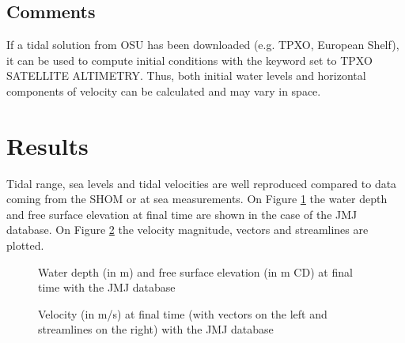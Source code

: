 \subsection{Comments}
%
If a tidal solution from OSU has been downloaded (e.g. TPXO, European
Shelf), it can be used to compute initial conditions with the keyword
 set to TPXO SATELLITE ALTIMETRY.
Thus, both initial water levels and horizontal components of velocity
can be calculated and may vary in space.
%
%
%
\section{Results}
%
Tidal range, sea levels and tidal velocities are well reproduced compared to
data coming from the SHOM or at sea measurements. On Figure \ref{fig:tide:H} the water depth
and free surface elevation at final time are shown in the case of the JMJ database.
On Figure \ref{fig:tide:U} the velocity magnitude, vectors and streamlines are plotted.

\begin{figure}[!htbp]
\begin{minipage}[t]{0.5\textwidth}
 \centering
\end{minipage}%
\begin{minipage}[t]{0.5\textwidth}
 \centering
\end{minipage}
  \caption{Water depth (in m) and free surface elevation (in m CD) at final time with the JMJ database}\label{fig:tide:H}
\end{figure}

\begin{figure}[H]
\begin{minipage}[t]{0.5\textwidth}
 \centering
\end{minipage}%
\begin{minipage}[t]{0.5\textwidth}
 \centering
\end{minipage}
  \caption{Velocity (in m/s) at final time (with vectors on the left and streamlines on the right) with the JMJ database}\label{fig:tide:U}
\end{figure}



